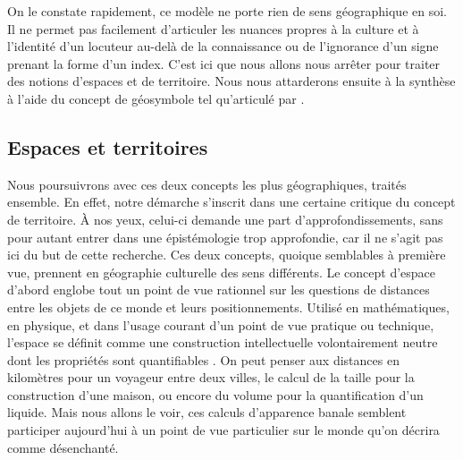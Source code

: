 On le constate rapidement, ce modèle ne porte  rien de sens géographique en soi.
Il ne permet pas facilement d'articuler les nuances propres à la culture et à l'identité d'un locuteur au-delà de la connaissance ou de l'ignorance d'un signe prenant la forme d'un index.
C'est ici que nous allons nous arrêter pour traiter des notions d'espaces et de territoire.
Nous nous attarderons ensuite à la synthèse à l'aide du concept de géosymbole tel qu'articulé par \citet{Bonnemaison1981}.


\subsection{Espaces et territoires}
\label{sec:espaces_et_territoires} Nous poursuivrons avec ces deux concepts les plus géographiques, traités ensemble.
En effet, notre démarche s'inscrit dans une certaine critique du concept de territoire.
À nos yeux, celui-ci demande une part d'approfondissements,  sans pour autant entrer dans une épistémologie trop approfondie, car il ne s'agit pas ici du but de cette recherche.
Ces deux concepts, quoique semblables à première vue, prennent en géographie culturelle des sens différents.
Le concept d'espace d'abord englobe  tout un point de vue rationnel sur les questions de distances entre les objets de ce monde et leurs positionnements.
Utilisé en mathématiques, en physique, et dans l'usage courant d'un point de vue pratique ou technique, l'espace se définit comme une construction intellectuelle volontairement neutre dont les propriétés sont quantifiables .
On peut penser aux distances en kilomètres pour un voyageur entre deux villes, le calcul de la taille pour la construction d'une maison, ou encore du volume pour la quantification d'un liquide.
Mais nous allons le voir, ces calculs d'apparence banale semblent participer aujourd'hui à un point de vue particulier sur le monde qu'on décrira comme désenchanté.

